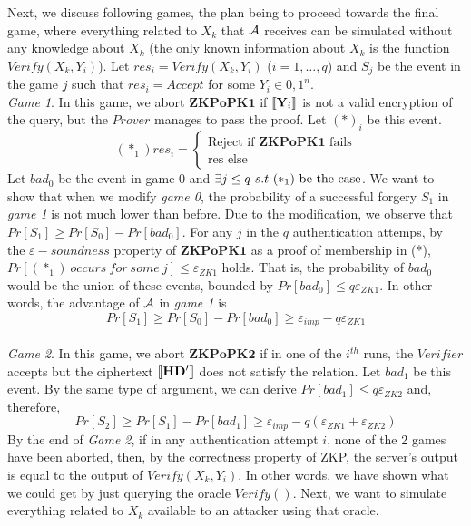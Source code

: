 Next, we discuss following games, the plan being to proceed towards the final
game, where everything related to $X_k$ that $\mathcal{A}$ receives can be simulated
without any knowledge about $X_k$ (the only known information about $X_k$ is the
function $Verify(X_k, Y_{i})$). Let $res_i = Verify(X_k, Y_{i})$ ($i = 1, \dots, q$) and $S_j$ be
the event in the game $j$ such that $res_i = Accept$ for some $Y_{i} \in {0,1}^{n}$.\\
\textit{Game 1}. In this game, we abort $\mathbf{ZKPoPK1}$ if $\left\llbracket\mathbf{Y}_{i}\right\rrbracket$ is
not a valid encryption of the query, but the $Prover$ manages to pass the
proof. Let $(*)_i$ be this event.
\[
  (*_1)res_i = \begin{cases}
    \text{Reject if } \mathbf{ZKPoPK1} \text{ fails}\\
    \text{res else}
  \end{cases}
\]
Let $bad_0$ be the event in game 0 and
$\exists j \leq q\ s.t\ (*_1)\ \textnormal{be the case}$. We want to show that
when we modify \textit{game 0}, the probability of a successful forgery $S_1$ in
\textit{game 1} is not much lower than before. Due to the modification, we
observe that $ Pr[S_1] \geq Pr[S_0] - Pr[bad_0] $. For any $j$ in the $q$
authentication attemps, by the $\varepsilon-soundness$ property of
$\mathbf{ZKPoPK1}$ as a proof of membership in (*),
$Pr[(*_1)\ occurs\ for\ some \ j] \leq \varepsilon_{ZK1}$ holds. That is, the
probability of $bad_0$ would be the union of these events, bounded by
$Pr[bad_0] \leq q\varepsilon_{ZK1}$. In other words, the advantage of
$\mathcal{A}$ in \textit{game 1} is
\[
  Pr[S_1] \geq Pr[S_0] - Pr[bad_0] \geq \varepsilon_{imp} - q\varepsilon_{ZK1}
\]
\\
\textit{Game 2}. In this game, we abort $\mathbf{ZKPoPK2}$ if in one of the
$i^{th}$ runs, the $Verifier$ accepts but the ciphertext $\left\llbracket\mathbf{HD'}\right\rrbracket$
does not satisfy the relation. Let $bad_1$ be this event. By the same type of
argument, we can derive $Pr[bad_1] \leq q\varepsilon_{ZK2}$ and, therefore,
$$Pr[S_2] \geq Pr[S_1]
- Pr[bad_1] \geq \varepsilon_{imp} - q(\varepsilon_{ZK1}+\varepsilon_{ZK2})
$$
By the end of \textit{Game 2}, if in any authentication attempt $i$, none of the
2 games have been aborted, then, by the correctness property of ZKP, the
server's output is equal to the output of $Verify(X_k, Y_{i})$. In other words,
we have shown what we could get by just querying the oracle $Verify()$. Next, we
want to simulate everything related to $X_k$ available to an attacker using that oracle.\\

